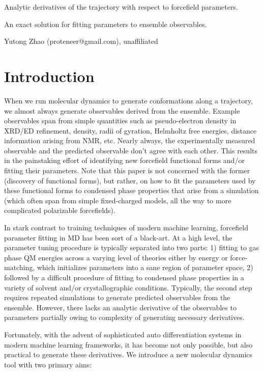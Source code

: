 \documentclass{article}
\begin{document}
\centerline{\sc \large Analytic derivatives of the trajectory with respect to forcefield parameters.}
\vspace{.5pc}
\centerline{An exact solution for fitting parameters to ensemble observables.}
\vspace{.5pc}
\centerline{Yutong Zhao (proteneer@gmail.com), unaffiliated}
\vspace{2pc}

\section{Introduction}

When we run molecular dynamics to generate conformations along a trajectory, we almost always generate observables derived from the ensemble. Example observables span from simple quantities such as pseudo-electron density in XRD/ED refinement, density, radii of gyration, Helmholtz free energies, distance information arising from NMR, etc. Nearly always, the experimentally measured observable and the predicted observable don't agree with each other. This results in the painstaking effort of identifying new forcefield functional forms and/or fitting their parameters. Note that this paper is not concerned with the former (discovery of functional forms), but rather, on how to fit the parameters used by these functional forms to condensed phase properties that arise from a simulation (which often span from simple fixed-charged models, all the way to more complicated polarizable forcefields).

In stark contrast to training techniques of modern machine learning, forcefield parameter fitting in MD has been sort of a black-art. At a high level, the parameter tuning procedure is typically separated into two parts: 1) fitting to gas phase QM energies across a varying level of theories either by energy or force-matching, which initializes parameters into a sane region of parameter space, 2) followed by a difficult procedure of fitting to condensed phase properties in a variety of solvent and/or crystallographic conditions. Typically, the second step requires repeated simulations to generate predicted observables from the ensemble. However, there lacks an analytic derivative of the observables to parameters partially owing to complexity of generating necessary derivatives.

Fortunately, with the advent of sophisticated auto differentiation systems in modern machine learning frameworks, it has become not only possible, but also practical to generate these derivatives. We introduce a new molecular dynamics tool with two primary aims:
\end{document}
